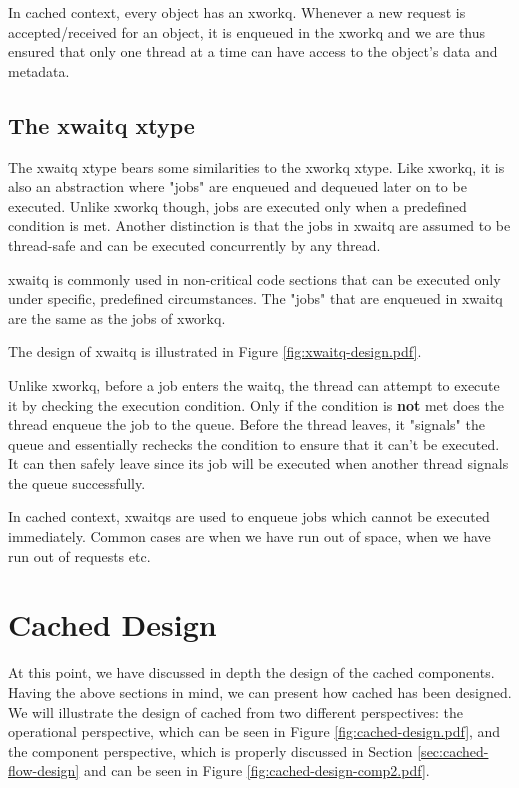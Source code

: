 In cached context, every object has an xworkq. Whenever a new request is 
accepted/received for an object, it is enqueued in the xworkq and we are thus 
ensured that only one thread at a time can have access to the object's data and 
metadata.

\subsection{The xwaitq xtype}\label{sec:xwaitq-design}

The xwaitq xtype bears some similarities to the xworkq xtype. Like xworkq, it 
is also an abstraction where "jobs" are enqueued and dequeued later on to be 
executed. Unlike xworkq though, jobs are executed only when a predefined 
condition is met. Another distinction is that the jobs in xwaitq are assumed to 
be thread-safe and can be executed concurrently by any thread.  

xwaitq is commonly used in non-critical code sections that can be executed only 
under specific, predefined circumstances. The "jobs" that are enqueued in 
xwaitq are the same as the jobs of xworkq.

The design of xwaitq is illustrated in Figure \ref{fig:xwaitq-design.pdf}.


Unlike xworkq, before a job enters the waitq, the thread can attempt to execute 
it by checking the execution condition. Only if the condition is \textbf{not} 
met does the thread enqueue the job to the queue. Before the thread leaves, it 
"signals" the queue and essentially rechecks the condition to ensure that it 
can't be executed. It can then safely leave since its job will be executed when 
another thread signals the queue successfully.

In cached context, xwaitqs are used to enqueue jobs which cannot be executed 
immediately. Common cases are when we have run out of space, when we have run 
out of requests etc.

\section{Cached Design}\label{sec:cached-design}

At this point, we have discussed in depth the design of the cached components.  
Having the above sections in mind, we can present how cached has been designed. 
We will illustrate the design of cached from two different perspectives: the 
operational perspective, which can be seen in Figure 
\ref{fig:cached-design.pdf}, and the component perspective, which is properly 
discussed in Section \ref{sec:cached-flow-design} and can be seen in Figure 
\ref{fig:cached-design-comp2.pdf}.

